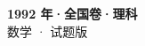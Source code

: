 \documentclass[zihao=-4, a4paper]{ctexart}
\begin{document}
\begin{center}
  {\Large\bfseries 1992 年·全国卷·理科}\\[4pt]
  {\large 数学 · 试题版}
\end{center}
\medskip
{}

\end{document}
